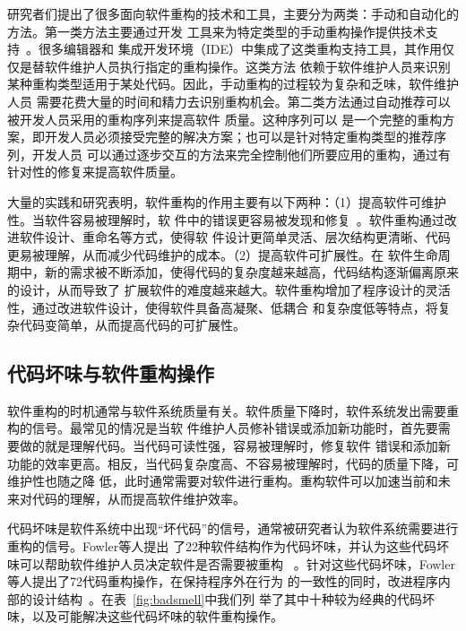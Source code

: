 研究者们提出了很多面向软件重构的技术和工具，主要分为两类：手动和自动化的方法。第一类方法主要通过开发
工具来为特定类型的手动重构操作提供技术支持~\cite{fowler1999refactoring, murphy2012we}。很多编辑器和
集成开发环境（IDE）中集成了这类重构支持工具，其作用仅仅是替软件维护人员执行指定的重构操作。这类方法
依赖于软件维护人员来识别某种重构类型适用于某处代码。因此，手动重构的过程较为复杂和乏味，软件维护人员
需要花费大量的时间和精力去识别重构机会。第二类方法通过自动推荐可以被开发人员采用的重构序列来提高软件
质量\cite{harman2007pareto, kessentini2011design, ouni2013maintainability, Silva2014}。这种序列可以
是一个完整的重构方案，即开发人员必须接受完整的解决方案；也可以是针对特定重构类型的推荐序列，开发人员
可以通过逐步交互的方法来完全控制他们所要应用的重构，通过有针对性的修复来提高软件质量。

大量的实践和研究表明，软件重构的作用主要有以下两种：（1）提高软件可维护性。当软件容易被理解时，软
件中的错误更容易被发现和修复~\cite{martin2009clean}。软件重构通过改进软件设计、重命名等方式，使得软
件设计更简单灵活、层次结构更清晰、代码更易被理解，从而减少代码维护的成本。（2）提高软件可扩展性。在
软件生命周期中，新的需求被不断添加，使得代码的复杂度越来越高，代码结构逐渐偏离原来的设计，从而导致了
扩展软件的难度越来越大。软件重构增加了程序设计的灵活性，通过改进软件设计，使得软件具备高凝聚、低耦合
和复杂度低等特点，将复杂代码变简单，从而提高代码的可扩展性。

\subsection{代码坏味与软件重构操作}
软件重构的时机通常与软件系统质量有关。软件质量下降时，软件系统发出需要重构的信号。最常见的情况是当软
件维护人员修补错误或添加新功能时，首先要需要做的就是理解代码。当代码可读性强，容易被理解时，修复软件
错误和添加新功能的效率更高。相反，当代码复杂度高、不容易被理解时，代码的质量下降，可维护性也随之降
低，此时通常需要对软件进行重构。重构软件可以加速当前和未来对代码的理解，从而提高软件维护效率。

代码坏味是软件系统中出现``坏代码''的信号，通常被研究者认为软件系统需要进行重构的信号。Fowler等人提出
了22种软件结构作为代码坏味，并认为这些代码坏味可以帮助软件维护人员决定软件是否需要被重构
~\cite{fowler1999refactoring}。针对这些代码坏味，Fowler等人提出了72代码重构操作，在保持程序外在行为
的一致性的同时，改进程序内部的设计结构~\cite{fowler1999refactoring}。在表~\ref{fig:badsmell}中我们列
举了其中十种较为经典的代码坏味，以及可能解决这些代码坏味的软件重构操作。

